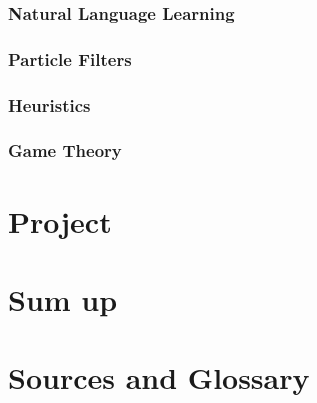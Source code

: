 \subsection{Natural Language Learning}
\subsection{Particle Filters}
\subsection{Heuristics}
\subsection{Game Theory}

\chapter{Project}



\chapter{Sum up}


\chapter{Sources and Glossary}

